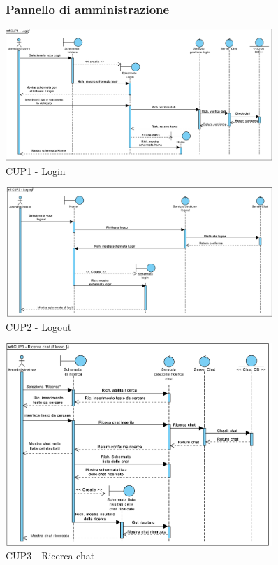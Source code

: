 \pagebreak

\begin{figure}
	\subsubsection{Pannello di amministrazione}
	\centering
	\includegraphics[width=0.9\textwidth]{imgs/gruppo6/sequence/CUP1_Login.pdf}
	\caption{CUP1 - Login}
	\label{fig:seq-cup1}
\end{figure}

\begin{figure}
	\centering
	\includegraphics[width=0.9\textwidth]{imgs/gruppo6/sequence/CUP2_logout.pdf}
	\caption{CUP2 - Logout}
	\label{fig:seq-cup2}
\end{figure}

\begin{figure}
	\centering
	\includegraphics[width=0.9\textwidth]{imgs/gruppo6/sequence/CUP3_ricerca_chat_flusso_1.pdf}
	\caption{CUP3 - Ricerca chat}
	\label{fig:seq-cup3}
\end{figure}


